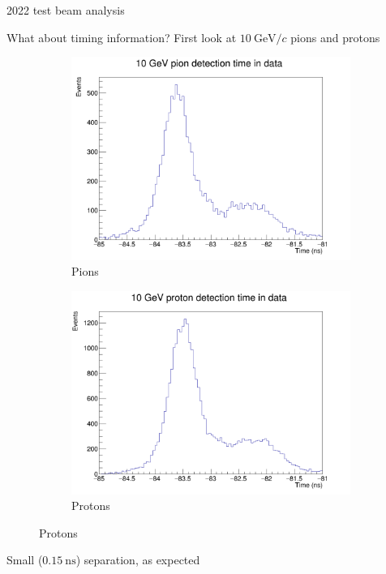 \documentclass[xcolor={dvipsnames}]{beamer}
\begin{document}
\begin{frame}{2022 test beam analysis}
  \begin{center}
    \Large{What about timing information? First look at $\SI{10}{\giga\eV/c}$ pions and protons}
  \end{center}
  \begin{figure}
    \centering
    \begin{subfigure}{0.5\textwidth}
      \includegraphics[width = 1.0\textwidth]{Figs/Time_Pos8_Pion_10GeV_Data.png}
      \caption{Pions}
    \end{subfigure}%
    \begin{subfigure}{0.5\textwidth}
      \includegraphics[width = 1.0\textwidth]{Figs/Time_Pos8_Proton_10GeV_Data.png}
      \caption{Protons}
    \end{subfigure}%
  \end{figure}
  \begin{center}
    Small ($\SI{0.15}{\nano\second}$) separation, as expected
  \end{center}
\end{frame}
\end{document}
